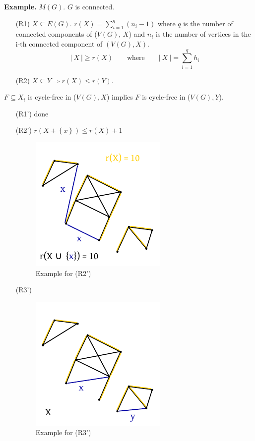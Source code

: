 \documentclass[a4paper]{article}
\theoremstyle{definition}
\newcommand{\card}[1]{\left|\:\!#1\:\!\right|}
\newcommand{\set}[1]{\left\{#1\right\}}
\begin{document}
\textbf{Example.}
  $M(G)$. $G$ is connected.
  \begin{itemize}
    \item[(R1)] $X \subseteq E(G)$. $r(X) = \sum_{i=1}^q (n_i - 1)$ where $q$ is the number of connected components of ($V(G)$, $X$) and $n_i$ is the number of vertices in the i-th connected component of $(V(G), X)$.
    \[ \card{X} \geq r(X) \qquad \text{where} \qquad \card{X} = \sum_{i=1}^q h_i \]
    \item[(R2)] $X \subseteq Y \Rightarrow r(X) \leq r(Y)$.
  \end{itemize}
  $F \subseteq X_i$ is cycle-free in ($V(G), X$) implies $F$ is cycle-free in ($V(G), Y$).
  \begin{itemize}
    \item[(R1')] done
    \item[(R2')] $r(X + \set{x}) \leq r(X) + 1$
      \begin{figure}[!ht]
        \begin{center}
          \includegraphics{img/r2_prime_example.pdf}
          \caption{Example for (R2')}
        \end{center}
      \end{figure}
    \item[(R3')]
      \begin{figure}[!ht]
        \begin{center}
          \includegraphics{img/r3_prime_example.pdf}
          \caption{Example for (R3')}
        \end{center}
      \end{figure}
  \end{itemize}
\end{document}
